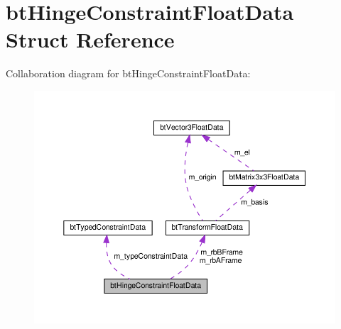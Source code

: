 \hypertarget{structbtHingeConstraintFloatData}{}\section{bt\+Hinge\+Constraint\+Float\+Data Struct Reference}
\label{structbtHingeConstraintFloatData}


Collaboration diagram for bt\+Hinge\+Constraint\+Float\+Data\+:
\nopagebreak
\begin{figure}[H]
\begin{center}
\leavevmode
\includegraphics[width=350pt]{structbtHingeConstraintFloatData__coll__graph}
\end{center}
\end{figure}
